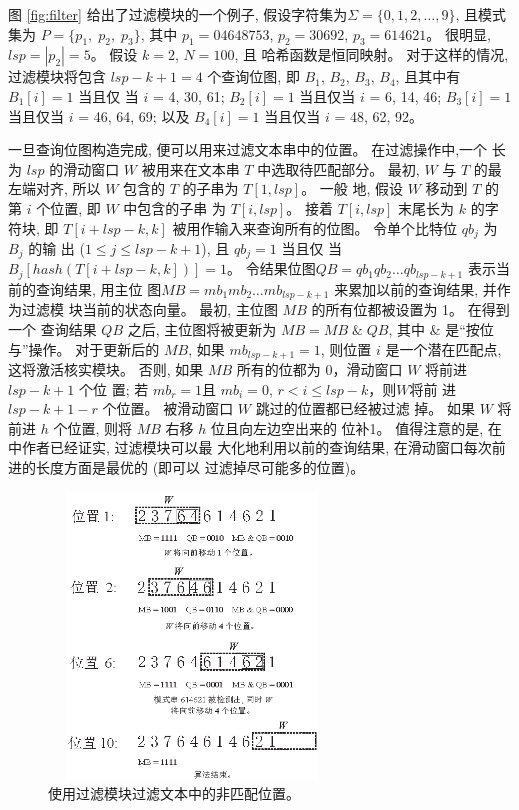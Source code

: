 图 \ref{fig:filter} 给出了过滤模块的一个例子,
假设字符集为$\Sigma = \{0, 1, 2, \dots, 9\}$, 且模式集为
$P = \{p_1,\; p_2,\; p_3\}$, 其中 $p_1 = 04648753$, $p_2 = 30692$,
$p_3 = 614621$。 很明显, $lsp = |p_2|= 5$。 假设 $k = 2$, $N = 100$, 且
哈希函数是恒同映射。 对于这样的情况, 过滤模块将包含 $lsp - k + 1 = 4$
个查询位图, 即 $B_1$, $B_2$, $B_3$, $B_4$, 且其中有 $B_1[i] = 1$ 当且仅
当 $i$ = 4, 30, 61; $B_2[i] = 1$ 当且仅当 $i$ = 6, 14, 46; $B_3[i] =
1$ 当且仅当 $i$ = 46, 64, 69; 以及 $B_4[i] = 1$ 当且仅当 $i$ = 48, 62,
92。

一旦查询位图构造完成, 便可以用来过滤文本串中的位置。 在过滤操作中,一个
长为 $lsp$ 的滑动窗口 $W$ 被用来在文本串 $T$ 中选取待匹配部分。 最初,
$W$ 与 $T$ 的最左端对齐, 所以 $W$ 包含的 $T$ 的子串为 $T[1,lsp]$。 一般
地, 假设 $W$ 移动到 $T$ 的第 $i$ 个位置, 即 $W$ 中包含的子串
为 $T[i,lsp]$。 接着 $T[i,lsp]$ 末尾长为 $k$ 的字符块, 即 $T[i+lsp-k,
k]$ 被用作输入来查询所有的位图。 令单个比特位 $qb_j$ 为 $B_j$ 的输
出 ($1 \leq j \leq lsp - k + 1$), 且 $qb_j=1$ 当且仅
当 $B_j[hash(T[i+lsp-k,k])] = 1$。
令结果位图$QB = qb_1qb_2 \dots qb_{lsp-k+1}$ 表示当前的查询结果, 用主位
图$MB = mb_1mb_2 \dots mb_{lsp-k+1}$ 来累加以前的查询结果, 并作为过滤模
块当前的状态向量。 最初, 主位图 $MB$ 的所有位都被设置为 1。 在得到一个
查询结果 $QB$ 之后, 主位图将被更新为 $MB = MB \; \& \;
QB$, 其中 \& 是“按位与”操作。 对于更新后的 $MB$, 如果 $mb_{lsp-k+1}
= 1$, 则位置 $i$ 是一个潜在匹配点, 这将激活核实模块。 否则, 如果 $MB$
所有的位都为 0，滑动窗口 $W$ 将前进 $lsp-k+1$ 个位
置; 若 $mb_r=1$且 $mb_i=0$, $r < i \leq lsp-k$，则$W$将前
进 $lsp-k+1-r$ 个位置。 被滑动窗口 $W$ 跳过的位置都已经被过滤
掉。  如果 $W$ 将前进 $h$ 个位置, 则将 $MB$ 右移 $h$ 位且向左边空出来的
位补1。 值得注意的是, 在 \cite{Lee2013} 中作者已经证实, 过滤模块可以最
大化地利用以前的查询结果, 在滑动窗口每次前进的长度方面是最优的 (即可以
过滤掉尽可能多的位置)。

\begin{figure}[H]
  \centering
  \includegraphics[height=3in, width=3in]{figures/2_MPM/filtering}
  \caption{使用过滤模块过滤文本中的非匹配位置。}
  \label{fig:f_match}
\end{figure}

